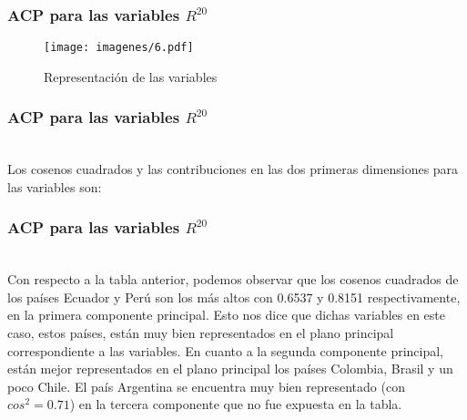 \documentclass[12pt]{beamer}
\begin{document}
\begin{frame}
\frametitle{ACP para las variables $R^{20}$}
\begin{figure}[h]
  \centering
  \texttt{[image: imagenes/6.pdf]}
  \caption{Representación de las variables}\label{figura1}
\end{figure}
\end{frame}

\begin{frame}
\frametitle{ACP para las variables $R^{20}$}
~\\Los cosenos cuadrados y las contribuciones en las dos primeras dimensiones para las variables son:
\begin{center}
\end{center}
\end{frame}

\begin{frame}
\frametitle{ACP para las variables $R^{20}$}
~\\Con respecto a la tabla anterior, podemos observar que los cosenos cuadrados de los países Ecuador y Perú son los más altos con 0.6537 y 0.8151 respectivamente, en la primera componente principal. Esto nos dice que dichas variables en este caso, estos países, están muy bien representados en el plano principal correspondiente  a las variables. En cuanto a la segunda componente principal, están mejor representados en el plano principal los países Colombia, Brasil y un poco Chile. El país Argentina se encuentra muy bien representado (con $cos^2=0.71$) en la tercera componente que no fue expuesta en la tabla.
\end{frame}
\end{document}
